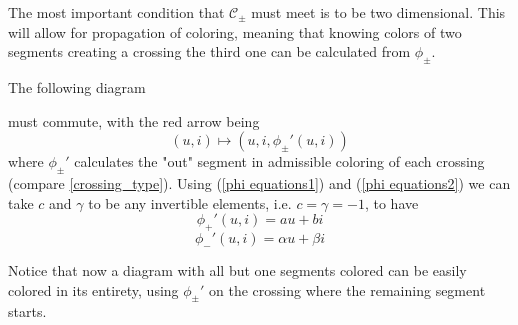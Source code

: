 The most important condition that $\mathcal{C}_\pm$ must meet is to be two dimensional. This will allow for propagation of coloring, meaning that knowing colors of two segments creating a crossing the third one can be calculated from $\phi_\pm$.

The following diagram
\begin{center}
\end{center}
must commute, with the red arrow being
$$(u, i)\mapsto (u, i, \phi_\pm'(u, i))$$
where $\phi_\pm'$ calculates the "out" segment in admissible coloring of each crossing (compare \cref{crossing_type}). Using (\ref{phi equations1}) and (\ref{phi equations2}) we can take $c$ and $\gamma$ to be any invertible elements, i.e. $c=\gamma=-1$, to have 
$$\phi_+'(u,i)=au+bi$$
$$\phi_-'(u,i)=\alpha u+\beta i$$

Notice that now a diagram with all but one segments colored can be easily colored in its entirety, using $\phi_\pm'$ on the crossing where the remaining segment starts.

